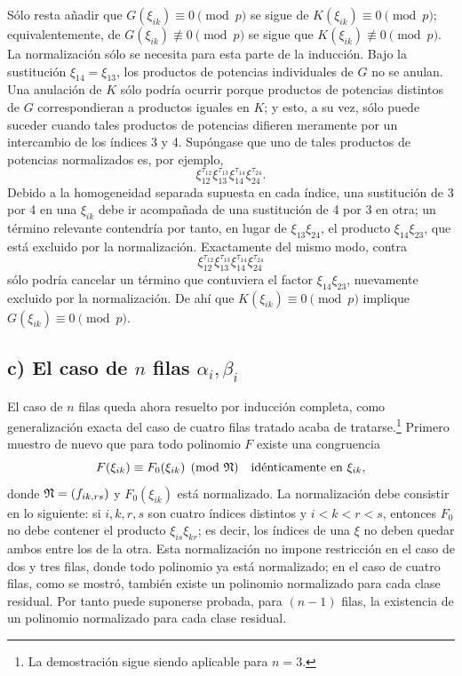 Sólo resta añadir que \(G(\xi_{ik})\equiv0\pmod p\) se sigue de \(K(\xi_{ik})\equiv0\pmod p\); equivalentemente, de \(G(\xi_{ik})\not\equiv0\pmod p\) se sigue que \(K(\xi_{ik})\not\equiv0\pmod p\). La normalización sólo se necesita para esta parte de la inducción. Bajo la sustitución \(\xi_{14}=\xi_{13}\), los productos de potencias individuales de \(G\) no se anulan. Una anulación de \(K\) sólo podría ocurrir porque productos de potencias distintos de \(G\) correspondieran a productos iguales en \(K\); y esto, a su vez, sólo puede suceder cuando tales productos de potencias difieren meramente por un intercambio de los índices 3 y 4. Supóngase que uno de tales productos de potencias normalizados es, por ejemplo,
\[
        \xi_{12}^{\tau_{12}}\xi_{13}^{\tau_{13}}\xi_{14}^{\tau_{14}}\xi_{24}^{\tau_{24}}.
\]
Debido a la homogeneidad separada supuesta en cada índice, una sustitución de 3 por 4 en una \(\xi_{ik}\) debe ir acompañada de una sustitución de 4 por 3 en otra; un término relevante contendría por tanto, en lugar de \(\xi_{13}\xi_{24}\), el producto \(\xi_{14}\xi_{23}\), que está excluido por la normalización. Exactamente del mismo modo, contra
\[
        \xi_{12}^{\tau_{12}}\xi_{13}^{\tau_{13}}\xi_{14}^{\tau_{14}}\xi_{24}^{\tau_{24}}
\]
sólo podría cancelar un término que contuviera el factor \(\xi_{14}\xi_{23}\), nuevamente excluido por la normalización. De ahí que \(K(\xi_{ik})\equiv0\pmod p\) implique \(G(\xi_{ik})\equiv0\pmod p\).

\subsection*{c) El caso de \(n\) filas \(\alpha_i,\beta_i\)}

El caso de \(n\) filas queda ahora resuelto por inducción completa, como generalización exacta del caso de cuatro filas tratado acaba de tratarse.\footnote{La demostración sigue siendo aplicable para \(n=3\).}
Primero muestro de nuevo que para todo polinomio \(F\) existe una congruencia
\begin{equation}
        F(\xi_{ik})\equiv F_0(\xi_{ik})\pmod{\mathfrak N}
        \quad \text{idénticamente en \(\xi_{ik}\)},
\end{equation}
donde \(\mathfrak N=(f_{ik,rs})\) y \(F_0(\xi_{ik})\) está normalizado. La normalización debe consistir en lo siguiente: si \(i,k,r,s\) son cuatro índices distintos y \(i<k<r<s\), entonces \(F_0\) no debe contener el producto \(\xi_{is}\xi_{kr}\); es decir, los índices de una \(\xi\) no deben quedar ambos entre los de la otra. Esta normalización no impone restricción en el caso de dos y tres filas, donde todo polinomio ya está normalizado; en el caso de cuatro filas, como se mostró, también existe un polinomio normalizado para cada clase residual. Por tanto puede suponerse probada, para \((n-1)\) filas, la existencia de un polinomio normalizado para cada clase residual.

